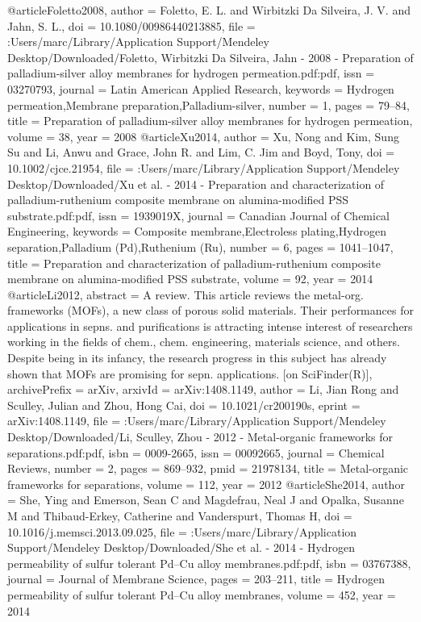 @article{Foletto2008,
author = {Foletto, E. L. and {Wirbitzki Da Silveira}, J. V. and Jahn, S. L.},
doi = {10.1080/00986440213885},
file = {:Users/marc/Library/Application Support/Mendeley Desktop/Downloaded/Foletto, Wirbitzki Da Silveira, Jahn - 2008 - Preparation of palladium-silver alloy membranes for hydrogen permeation.pdf:pdf},
issn = {03270793},
journal = {Latin American Applied Research},
keywords = {Hydrogen permeation,Membrane preparation,Palladium-silver},
number = {1},
pages = {79--84},
title = {{Preparation of palladium-silver alloy membranes for hydrogen permeation}},
volume = {38},
year = {2008}
}
@article{Xu2014,
author = {Xu, Nong and Kim, Sung Su and Li, Anwu and Grace, John R. and Lim, C. Jim and Boyd, Tony},
doi = {10.1002/cjce.21954},
file = {:Users/marc/Library/Application Support/Mendeley Desktop/Downloaded/Xu et al. - 2014 - Preparation and characterization of palladium-ruthenium composite membrane on alumina-modified PSS substrate.pdf:pdf},
issn = {1939019X},
journal = {Canadian Journal of Chemical Engineering},
keywords = {Composite membrane,Electroless plating,Hydrogen separation,Palladium (Pd),Ruthenium (Ru)},
number = {6},
pages = {1041--1047},
title = {{Preparation and characterization of palladium-ruthenium composite membrane on alumina-modified PSS substrate}},
volume = {92},
year = {2014}
}
@article{Li2012,
abstract = {A review. This article reviews the metal-org. frameworks (MOFs), a new class of porous solid materials. Their performances for applications in sepns. and purifications is attracting intense interest of researchers working in the fields of chem., chem. engineering, materials science, and others. Despite being in its infancy, the research progress in this subject has already shown that MOFs are promising for sepn. applications. [on SciFinder(R)]},
archivePrefix = {arXiv},
arxivId = {arXiv:1408.1149},
author = {Li, Jian Rong and Sculley, Julian and Zhou, Hong Cai},
doi = {10.1021/cr200190s},
eprint = {arXiv:1408.1149},
file = {:Users/marc/Library/Application Support/Mendeley Desktop/Downloaded/Li, Sculley, Zhou - 2012 - Metal-organic frameworks for separations.pdf:pdf},
isbn = {0009-2665},
issn = {00092665},
journal = {Chemical Reviews},
number = {2},
pages = {869--932},
pmid = {21978134},
title = {{Metal-organic frameworks for separations}},
volume = {112},
year = {2012}
}
@article{She2014,
author = {She, Ying and Emerson, Sean C and Magdefrau, Neal J and Opalka, Susanne M and Thibaud-Erkey, Catherine and Vanderspurt, Thomas H},
doi = {10.1016/j.memsci.2013.09.025},
file = {:Users/marc/Library/Application Support/Mendeley Desktop/Downloaded/She et al. - 2014 - Hydrogen permeability of sulfur tolerant Pd–Cu alloy membranes.pdf:pdf},
isbn = {03767388},
journal = {Journal of Membrane Science},
pages = {203--211},
title = {{Hydrogen permeability of sulfur tolerant Pd–Cu alloy membranes}},
volume = {452},
year = {2014}
}
